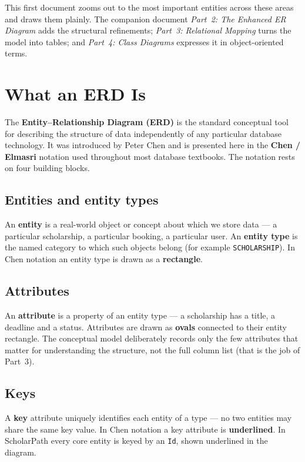 \documentclass[11pt,a4paper]{article}
\begin{document}
This first document zooms out to the most important entities across these areas
and draws them plainly. The companion document \emph{Part~2: The Enhanced ER
Diagram} adds the structural refinements; \emph{Part~3: Relational Mapping}
turns the model into tables; and \emph{Part~4: Class Diagrams} expresses it in
object-oriented terms.

\section{What an ERD Is}

The \textbf{Entity--Relationship Diagram (ERD)} is the standard conceptual tool
for describing the structure of data independently of any particular database
technology. It was introduced by Peter Chen and is presented here in the
\textbf{Chen / Elmasri} notation used throughout most database textbooks. The
notation rests on four building blocks.

\subsection{Entities and entity types}

An \textbf{entity} is a real-world object or concept about which we store data
--- a particular scholarship, a particular booking, a particular user. An
\textbf{entity type} is the named category to which such objects belong (for
example \texttt{SCHOLARSHIP}). In Chen notation an entity type is drawn as a
\textbf{rectangle}.

\subsection{Attributes}

An \textbf{attribute} is a property of an entity type --- a scholarship has a
title, a deadline and a status. Attributes are drawn as \textbf{ovals}
connected to their entity rectangle. The conceptual model deliberately records
only the few attributes that matter for understanding the structure, not the
full column list (that is the job of Part~3).

\subsection{Keys}

A \textbf{key} attribute uniquely identifies each entity of a type --- no two
entities may share the same key value. In Chen notation a key attribute is
\textbf{underlined}. In ScholarPath every core entity is keyed by an
\texttt{Id}, shown underlined in the diagram.
\end{document}
